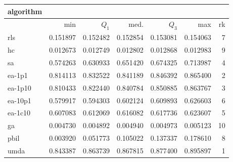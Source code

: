 \begin{tabular}{@{}l*{5}{>{{}}N{1}{3}}>{{}}N{2}{0}@{}}
\toprule
{algorithm} &  \\
\midrule
& {min} & {$Q_1$} & {med.} & {$Q_3$} & {max} & {rk}\\
\midrule
rls & 0.151897 & 0.152482 & 0.152854 & 0.153081 & 0.154063 & 7\\
hc & 0.012673 & 0.012749 & 0.012802 & 0.012868 & 0.012983 & 9\\
sa & 0.574263 & 0.630933 & 0.651420 & 0.674325 & 0.713987 & 4\\
ea-1p1 & 0.814113 & 0.832522 & 0.841189 & 0.846392 & 0.865400 & 2\\
ea-1p10 & 0.810433 & 0.822440 & 0.840784 & 0.850885 & 0.863767 & 3\\
ea-10p1 & 0.579917 & 0.594303 & 0.602124 & 0.609893 & 0.626603 & 6\\
ea-1c10 & 0.607083 & 0.612069 & 0.616082 & 0.617736 & 0.623607 & 5\\
ga & 0.004730 & 0.004892 & 0.004940 & 0.004973 & 0.005123 & 10\\
pbil & 0.003920 & 0.051773 & 0.105022 & 0.137337 & 0.178610 & 8\\
umda & {\color{blue}} 0.843387 & {\color{blue}} 0.863739 & {\color{blue}} 0.867815 & {\color{blue}} 0.877400 & {\color{blue}} 0.895897 & 1\\
\bottomrule
\end{tabular}
